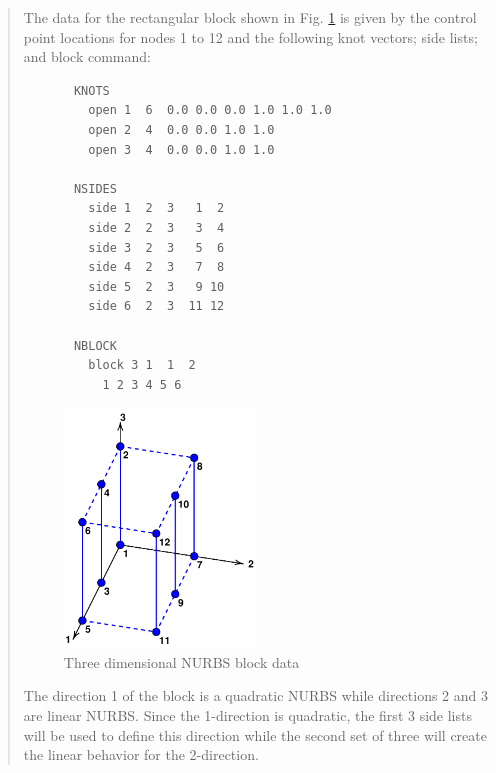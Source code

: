 \begin{quote}

The data for the rectangular block shown in Fig. \ref{afig3b} is given by
the control point locations for nodes 1 to 12 and the following knot vectors;
side lists; and block command:

\begin{minipage}{\textwidth}
\setlength{\baselineskip}{12pt}
\begin{verbatim}
       KNOTS
         open 1  6  0.0 0.0 0.0 1.0 1.0 1.0
         open 2  4  0.0 0.0 1.0 1.0
         open 3  4  0.0 0.0 1.0 1.0

       NSIDES
         side 1  2  3   1  2
         side 2  2  3   3  4
         side 3  2  3   5  6
         side 4  2  3   7  8
         side 5  2  3   9 10
         side 6  2  3  11 12

       NBLOCK
         block 3 1  1  2
           1 2 3 4 5 6

\end{verbatim}
\setlength{\baselineskip}{14pt}
\end{minipage}

\begin{figure}[b!]
\begin{center}

\includegraphics[height=2.5in]{figs/nblock3d}

\caption{Three dimensional NURBS block data \label{afig3b} }
\end{center}
\end{figure}

The direction 1 of the block is
a quadratic NURBS while directions 2 and 3 are linear NURBS.
Since the 1-direction is quadratic, the first 3 side lists will be used to
define this direction while the second set of three will create the linear
behavior for the 2-direction.
\end{quote}
